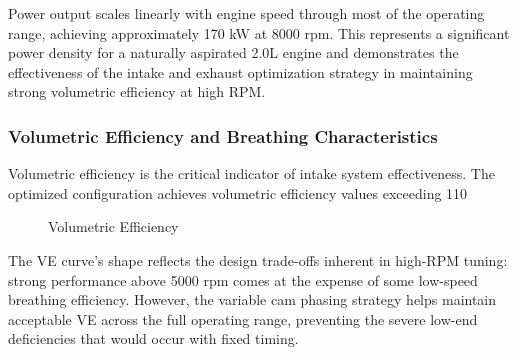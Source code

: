 Power output scales linearly with engine speed through most of the operating range, achieving approximately 170 kW at 8000 rpm. This represents a significant power density for a naturally aspirated 2.0L engine and demonstrates the effectiveness of the intake and exhaust optimization strategy in maintaining strong volumetric efficiency at high RPM.

\subsubsection{Volumetric Efficiency and Breathing Characteristics}

Volumetric efficiency is the critical indicator of intake system effectiveness. The optimized configuration achieves volumetric efficiency values exceeding 110%

\begin{figure}[H]
    \centering
    \begin{minipage}{\textwidth}
        \centering
        \caption{Volumetric Efficiency}
        \label{fig:task2_ve_detail}
    \end{minipage}
\end{figure}

The VE curve's shape reflects the design trade-offs inherent in high-RPM tuning: strong performance above 5000 rpm comes at the expense of some low-speed breathing efficiency. However, the variable cam phasing strategy helps maintain acceptable VE across the full operating range, preventing the severe low-end deficiencies that would occur with fixed timing. 

